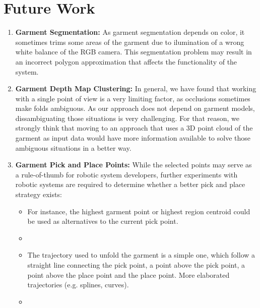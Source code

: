 \section{Future Work}
\label{conclusions:future_work}

\begin{enumerate}
	\item \textbf{Garment Segmentation:} As garment segmentation depends on color, it sometimes trims some areas of the garment due to ilumination of a wrong white balance of the RGB camera. This segmentation problem may result in an incorrect polygon approximation that affects the functionality of the system.
	\item \textbf{Garment Depth Map Clustering:} In general, we have found that working with a single point of view is a very limiting factor, as occlusions sometimes make folds ambiguous. As our approach does not depend on garment models, dissambiguating those situations is very challenging. For that reason, we strongly think that moving to an approach that uses a 3D point cloud of the garment as input data would have more information available to solve those ambiguous situations in a better way.

	\item \textbf{Garment Pick and Place Points:} While the selected points may serve as a rule-of-thumb for robotic system developers, further experiments with robotic systems are required to determine whether a better pick and place strategy exists:
	
\begin{itemize}
\item For instance, the highest garment point or highest region centroid could be used as alternatives to the current pick point.

\item {}	

\item The trajectory used to unfold the garment is a simple one, which follow a straight line connecting the pick point, a point above the pick point, a point above the place point and the place point. More elaborated trajectories (e.g. splines, curves).

\item {}	
\end{itemize}
\end{enumerate}



